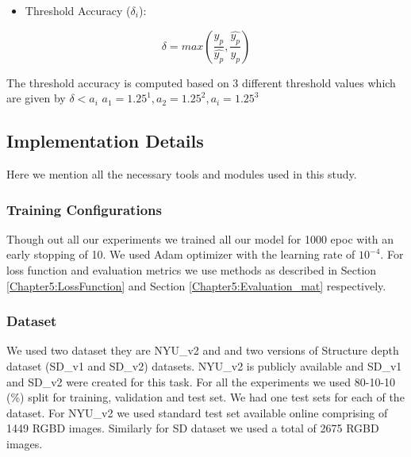 \begin{itemize}
    \item Threshold Accuracy (\(\delta_{i}\)): 
\end{itemize}{}

\begin{equation} \label{ThresholdAcc}
    {\delta = max (\frac{{y_{p}}}{\hat{y_{p}}}, \frac{\hat{y_{p}}}{{y_{p}}})}
\end{equation}

The threshold accuracy is computed based on 3 different threshold values which are given by \(\delta < a_{i}\)  \(a_{1}= 1.25^1, a_{2} = 1.25^2, a_{i} = 1.25^3\)  






\subsection{Implementation Details}
\label{Chapter5:HardwarSoftwareDetails}
Here we mention all the necessary tools and modules used in this study. 

 \subsubsection{Training Configurations} 
 \label{Chapter4:TrainConfigurations_i}

 Though out all our  experiments we trained all our model for 1000 epoc with an early stopping of 10. We used Adam \cite{kingma2014adam} optimizer with the learning rate of \(10^{-4}\). For loss function and evaluation metrics we use methods as described in Section \ref{Chapter5:LossFunction} and Section \ref{Chapter5:Evaluation_mat} respectively.
 
 \subsubsection{Dataset} 
  \label{Chapter4:DatasetForsplits-i}

 We used two dataset they are NYU\_v2 and and two versions of Structure depth dataset (SD\_v1 and SD\_v2) datasets. NYU\_v2 is publicly available and SD\_v1 and SD\_v2 were created for this task. For all the experiments we used 80-10-10 (\%) split for training, validation and test set. We had one test sets for each of the dataset. For NYU\_v2 we used standard test set available online comprising of 1449 RGBD images. Similarly for SD dataset we used a total of 2675 RGBD images.
 
